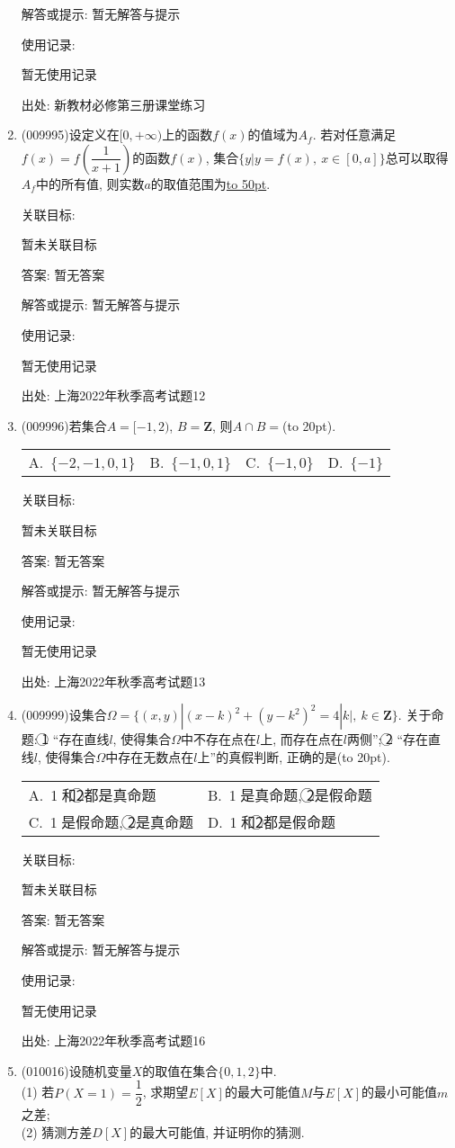 \documentclass[10pt,a4paper]{article}
\newcommand{\blank}[1]{\underline{\hbox to #1pt{}}}
\newcommand{\bracket}[1]{(\hbox to #1pt{})}
\newcommand{\twoch}[4]{\par\begin{tabular}{p{.46\textwidth}p{.46\textwidth}}
A.~#1& B.~#2\\
C.~#3& D.~#4
\end{tabular}}
\newcommand{\fourch}[4]{\par\begin{tabular}{p{.23\textwidth}p{.23\textwidth}p{.23\textwidth}p{.23\textwidth}}
A.~#1 &B.~#2& C.~#3& D.~#4
\end{tabular}}
\begin{document}
\begin{enumerate}[1.]
解答或提示: 暂无解答与提示

使用记录:

暂无使用记录


出处: 新教材必修第三册课堂练习
\item { (009995)}设定义在$[0,+\infty)$上的函数$f(x)$的值域为$A_f$. 若对任意满足$f(x)=f(\dfrac 1{x+1})$的函数$f(x)$, 集合$\{y|y=f(x), \ x\in [0,a]\}$总可以取得$A_f$中的所有值, 则实数$a$的取值范围为\blank{50}.


关联目标:

暂未关联目标

答案: 暂无答案

解答或提示: 暂无解答与提示

使用记录:

暂无使用记录


出处: 上海2022年秋季高考试题12
\item { (009996)}若集合$A=[-1,2)$, $B=\mathbf{Z}$, 则$A\cap B=$\bracket{20}.
\fourch{$\{-2,-1,0,1\}$}{$\{-1,0,1\}$}{$\{-1,0\}$}{$\{-1\}$}


关联目标:

暂未关联目标

答案: 暂无答案

解答或提示: 暂无解答与提示

使用记录:

暂无使用记录


出处: 上海2022年秋季高考试题13
\item { (009999)}设集合$\Omega = \{(x,y)|(x-k)^2+(y-k^2)^2=4|k|, \ k\in \mathbf{Z}\}$. 关于命题:
\textcircled{1} ``存在直线$l$, 使得集合$\Omega$中不存在点在$l$上, 而存在点在$l$两侧''; \textcircled{2} ``存在直线$l$, 使得集合$\Omega$中存在无数点在$l$上''的真假判断, 正确的是\bracket{20}.
\twoch{\textcircled{1}和\textcircled{2}都是真命题}{\textcircled{1}是真命题, \textcircled{2}是假命题}{\textcircled{1}是假命题, \textcircled{2}是真命题}{\textcircled{1}和\textcircled{2}都是假命题}


关联目标:

暂未关联目标

答案: 暂无答案

解答或提示: 暂无解答与提示

使用记录:

暂无使用记录


出处: 上海2022年秋季高考试题16
\item { (010016)}设随机变量$X$的取值在集合$\{0,1,2\}$中.\\
(1) 若$P(X=1)=\dfrac 12$, 求期望$E[X]$的最大可能值$M$与$E[X]$的最小可能值$m$之差;\\
(2) 猜测方差$D[X]$的最大可能值, 并证明你的猜测.



\end{enumerate}
\end{document}
